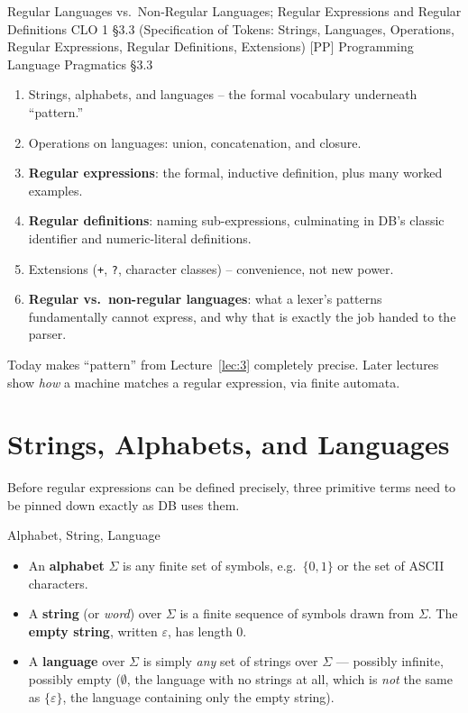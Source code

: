 \documentclass[full-course-notes.tex]{subfiles}
\begin{document}
  {Regular Languages vs.\ Non-Regular Languages; Regular Expressions and Regular Definitions}
  {CLO 1}
  {\S3.3 (Specification of Tokens: Strings, Languages, Operations, Regular Expressions, Regular Definitions, Extensions)}
  {[PP] Programming Language Pragmatics \S3.3}
\setcounter{section}{0}
\makelecturetitle

\begin{coreidea}
\begin{enumerate}
  \item Strings, alphabets, and languages -- the formal vocabulary underneath ``pattern.''
  \item Operations on languages: union, concatenation, and closure.
  \item \textbf{Regular expressions}: the formal, inductive definition, plus many worked examples.
  \item \textbf{Regular definitions}: naming sub-expressions, culminating in DB's classic
  identifier and numeric-literal definitions.
  \item Extensions (\texttt{+}, \texttt{?}, character classes) -- convenience, not new power.
  \item \textbf{Regular vs.\ non-regular languages}: what a lexer's patterns fundamentally
  cannot express, and why that is exactly the job handed to the parser.
\end{enumerate}
Today makes ``pattern'' from Lecture~\ref{lec:3} completely precise. Later lectures show
\emph{how} a machine matches a regular expression, via finite automata.
\end{coreidea}

\section{Strings, Alphabets, and Languages}
\label{sec:l4-strings-alphabets-languages}

\dbtag Before regular expressions can be defined precisely, three primitive terms need to be
pinned down exactly as DB uses them.

\begin{defbox}{Alphabet, String, Language}
\begin{itemize}
  \item An \textbf{alphabet} $\Sigma$ is any finite set of symbols, e.g.\ $\{0,1\}$ or the set
  of ASCII characters.
  \item A \textbf{string} (or \emph{word}) over $\Sigma$ is a finite sequence of symbols drawn
  from $\Sigma$. The \textbf{empty string}, written $\varepsilon$, has length 0.
  \item A \textbf{language} over $\Sigma$ is simply \emph{any} set of strings over $\Sigma$ ---
  possibly infinite, possibly empty ($\emptyset$, the language with no strings at all, which is
  \emph{not} the same as $\{\varepsilon\}$, the language containing only the empty string).
\end{itemize}
\end{defbox}
\end{document}
